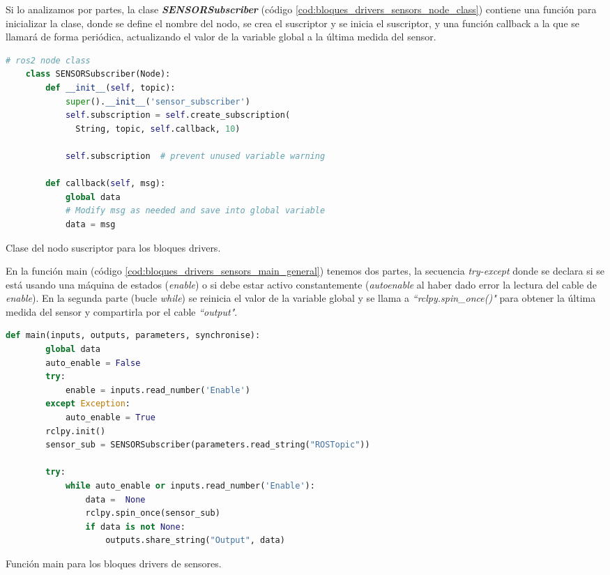 Si lo analizamos por partes, la clase \textbf{\textit{SENSORSubscriber}} (código \ref{cod:bloques_drivers_sensors_node_class}) contiene una función
para inicializar la clase, donde se define el nombre del nodo, se crea el suscriptor y se inicia el suscriptor, y una función callback a la que se
llamará de forma periódica, actualizando el valor de la variable global a la última medida del sensor.

\begin{code}[H]
  \begin{lstlisting}[language=python]
    # ros2 node class
    class SENSORSubscriber(Node):
        def __init__(self, topic):
            super().__init__('sensor_subscriber')
            self.subscription = self.create_subscription(
              String, topic, self.callback, 10)

            self.subscription  # prevent unused variable warning
    
        def callback(self, msg):
            global data
            # Modify msg as needed and save into global variable
            data = msg
  \end{lstlisting}
  \caption[Clase del nodo suscriptor para bloques drivers]{Clase del nodo suscriptor para los bloques drivers.}
  \label{cod:bloques_drivers_sensors_node_class}
\end{code}

En la función main (código \ref{cod:bloques_drivers_sensors_main_general}) tenemos dos partes, la secuencia \textit{try-except} donde se declara
si se está usando una máquina de estados (\textit{enable}) o si debe estar activo constantemente (\textit{autoenable} al haber dado error la lectura
del cable de \textit{enable}).
En la segunda parte (bucle \textit{while}) se reinicia el valor de la variable global y se llama a \textit{``rclpy.spin\_once()"} para obtener la
última medida del sensor y compartirla por el cable \textit{``output"}.

\begin{code}[H]
  \begin{lstlisting}[language=python]
    def main(inputs, outputs, parameters, synchronise):
        global data
        auto_enable = False
        try:
            enable = inputs.read_number('Enable')
        except Exception:
            auto_enable = True
        rclpy.init()
        sensor_sub = SENSORSubscriber(parameters.read_string("ROSTopic"))

        try:
            while auto_enable or inputs.read_number('Enable'):
                data =  None
                rclpy.spin_once(sensor_sub)
                if data is not None:
                    outputs.share_string("Output", data)
  \end{lstlisting}
  \caption[Función main para bloques drivers de sensores]{Función main para los bloques drivers de sensores.}
  \label{cod:bloques_drivers_sensors_main_general}
\end{code}

